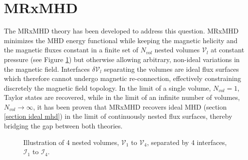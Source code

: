 \documentclass[my_thesis.tex]{subfiles}
\begin{document}
\section{MRxMHD}
\label{section mrxmhd}
The \ac{MRxMHD} theory \citep{Dewar2015, Hole2006} has been developed to address this question. \ac{MRxMHD} minimizes the \ac{MHD} energy functional \citep{kruskal_equilibrium_1958} while keeping the magnetic helicity and the magnetic fluxes constant \citep{Dewar2015} in a finite set of $N_{vol}$ nested volumes $\mathcal{V}_l$ at constant pressure (see Figure \ref{fig:Illustration_SPEC}) but otherwise allowing arbitrary, non-ideal variations in the magnetic field. Interfaces $\delta\mathcal{V}_l$ separating the volumes are ideal flux surfaces which therefore cannot undergo magnetic re-connection, effectively constraining discretely the magnetic field topology. In the limit of a single volume, $N_{vol}=1$, Taylor states \citep{Taylor1974, Taylor1986} are recovered, while in the limit of an infinite number of volumes, $N_{vol}\rightarrow\infty$, it has been proven that \ac{MRxMHD} recovers ideal \ac{MHD} (section \ref{section ideal mhd}) \citep{Dennis2013} in the limit of continuously nested flux surfaces, thereby bridging the gap between both theories.


\begin{figure}
	\centering
	\caption{Illustration of 4 nested volumes, $\mathcal{V}_1$ to $\mathcal{V}_4$, separated by 4 interfaces, $\mathcal{I}_1$ to $\mathcal{I}_4$.}
	\label{fig:Illustration_SPEC}
\end{figure}
\end{document}
